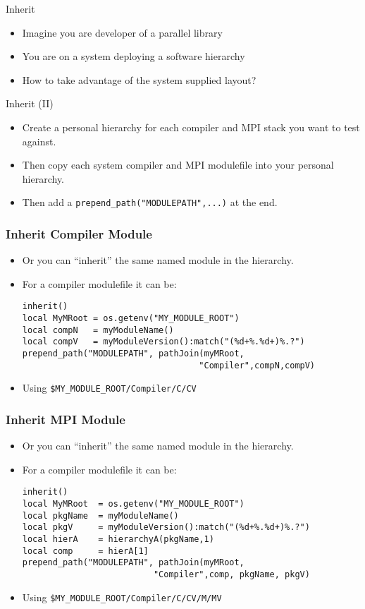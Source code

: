 \documentclass{beamer}
\begin{document}
\begin{frame}{Inherit}
  \begin{itemize}
    \item Imagine you are developer of a parallel library
    \item You are on a system deploying a software hierarchy
    \item How to take advantage of the system supplied layout?
  \end{itemize}
\end{frame}

\begin{frame}{Inherit (II)}
  \begin{itemize}
    \item Create a personal hierarchy for each compiler and MPI stack
      you want to test against. 
    \item Then copy each system compiler and MPI modulefile into your
      personal hierarchy.
    \item Then add a \texttt{prepend\_path("MODULEPATH",...)} at the
      end.
  \end{itemize}
\end{frame}

\begin{frame}[fragile]
    \frametitle{Inherit Compiler Module }
  \begin{itemize}
    \item Or you can ``inherit'' the same named module in the hierarchy.
    \item For a compiler modulefile it can be:
    {\small
\begin{verbatim}
inherit()
local MyMRoot = os.getenv("MY_MODULE_ROOT")
local compN   = myModuleName()
local compV   = myModuleVersion():match("(%d+%.%d+)%.?")
prepend_path("MODULEPATH", pathJoin(myMRoot,
                                   "Compiler",compN,compV)
\end{verbatim}
}
    \item Using \texttt{\$MY\_MODULE\_ROOT/Compiler/C/CV}
  \end{itemize}
\end{frame}

\begin{frame}[fragile]
    \frametitle{Inherit MPI Module }
  \begin{itemize}
    \item Or you can ``inherit'' the same named module in the hierarchy.
    \item For a compiler modulefile it can be:
    {\small
\begin{verbatim}
inherit()
local MyMRoot  = os.getenv("MY_MODULE_ROOT")
local pkgName  = myModuleName()
local pkgV     = myModuleVersion():match("(%d+%.%d+)%.?")
local hierA    = hierarchyA(pkgName,1)
local comp     = hierA[1]
prepend_path("MODULEPATH", pathJoin(myMRoot,
                          "Compiler",comp, pkgName, pkgV)
\end{verbatim}
}
    \item Using \texttt{\$MY\_MODULE\_ROOT/Compiler/C/CV/M/MV}
  \end{itemize}
\end{frame}
\end{document}
